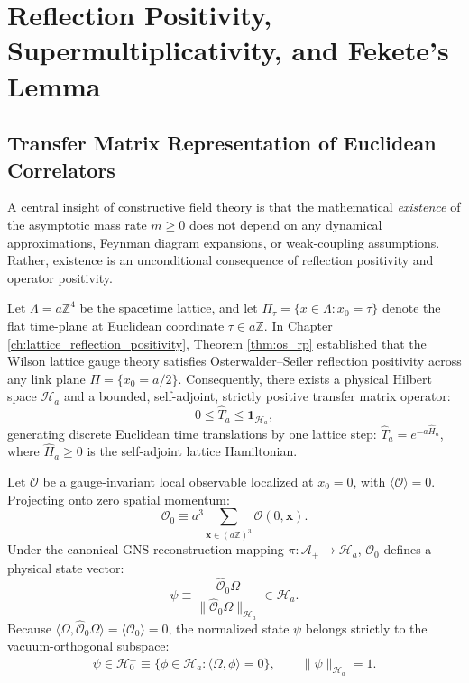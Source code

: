 \section{Reflection Positivity, Supermultiplicativity, and Fekete's Lemma}
\label{sec:fekete_superadditivity}

\subsection{Transfer Matrix Representation of Euclidean Correlators}
\label{subsec:transfer_matrix_correlators}

A central insight of constructive field theory is that the mathematical \emph{existence} of the asymptotic mass rate $m \ge 0$ does not depend on any dynamical approximations, Feynman diagram expansions, or weak-coupling assumptions. Rather, existence is an unconditional consequence of reflection positivity and operator positivity.

Let $\Lambda = a \mathbb{Z}^4$ be the spacetime lattice, and let $\Pi_\tau = \{x \in \Lambda : x_0 = \tau\}$ denote the flat time-plane at Euclidean coordinate $\tau \in a \mathbb{Z}$. In Chapter \ref{ch:lattice_reflection_positivity}, Theorem \ref{thm:os_rp} established that the Wilson lattice gauge theory satisfies Osterwalder--Seiler reflection positivity across any link plane $\Pi = \{x_0 = a/2\}$. Consequently, there exists a physical Hilbert space $\mathcal{H}_a$ and a bounded, self-adjoint, strictly positive transfer matrix operator:
\begin{equation}
\label{eq:transfer_op_bounds}
0 \le \hat{T}_a \le \mathbf{1}_{\mathcal{H}_a},
\end{equation}
generating discrete Euclidean time translations by one lattice step: $\hat{T}_a = e^{-a \hat{H}_a}$, where $\hat{H}_a \ge 0$ is the self-adjoint lattice Hamiltonian.

Let $\mathcal{O}$ be a gauge-invariant local observable localized at $x_0 = 0$, with $\langle \mathcal{O} \rangle = 0$. Projecting onto zero spatial momentum:
\begin{equation}
\label{eq:spatial_zero_momentum_proj}
\mathcal{O}_0 \equiv a^3 \sum_{\mathbf{x} \in (a\mathbb{Z})^3} \mathcal{O}(0, \mathbf{x}).
\end{equation}
Under the canonical GNS reconstruction mapping $\pi: \mathcal{A}_+ \to \mathcal{H}_a$, $\mathcal{O}_0$ defines a physical state vector:
\begin{equation}
\label{eq:state_vector_psi}
\psi \equiv \frac{\hat{\mathcal{O}}_0 \Omega}{\|\hat{\mathcal{O}}_0 \Omega\|_{\mathcal{H}_a}} \in \mathcal{H}_a.
\end{equation}
Because $\langle \Omega, \hat{\mathcal{O}}_0 \Omega \rangle = \langle \mathcal{O}_0 \rangle = 0$, the normalized state $\psi$ belongs strictly to the vacuum-orthogonal subspace:
\begin{equation}
\label{eq:vacuum_orthogonal_psi}
\psi \in \mathcal{H}_0^\perp \equiv \{ \phi \in \mathcal{H}_a : \langle \Omega, \phi \rangle = 0 \}, \qquad \|\psi\|_{\mathcal{H}_a} = 1.
\end{equation}

